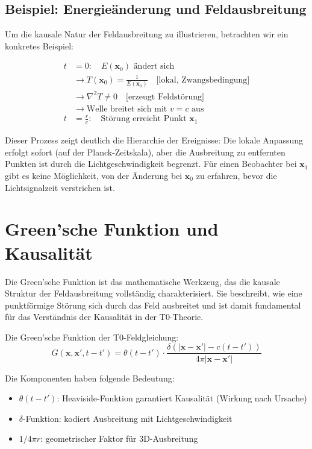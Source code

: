 	\subsection{Beispiel: Energieänderung und Feldausbreitung}
	
	Um die kausale Natur der Feldausbreitung zu illustrieren, betrachten wir ein konkretes Beispiel:
	
	\begin{align}
		t &= 0: \quad E(\mathbf{x}_0) \text{ ändert sich} \\
		&\rightarrow T(\mathbf{x}_0) = \frac{1}{E(\mathbf{x}_0)} \quad \text{[lokal, Zwangsbedingung]} \\
		&\rightarrow \nabla^2 T \neq 0 \quad \text{[erzeugt Feldstörung]} \\
		&\rightarrow \text{Welle breitet sich mit } v = c \text{ aus} \\
		t &= \frac{r}{c}: \quad \text{Störung erreicht Punkt } \mathbf{x}_1
	\end{align}
	
	Dieser Prozess zeigt deutlich die Hierarchie der Ereignisse: Die lokale Anpassung erfolgt sofort (auf der Planck-Zeitskala), aber die Ausbreitung zu entfernten Punkten ist durch die Lichtgeschwindigkeit begrenzt. Für einen Beobachter bei $\mathbf{x}_1$ gibt es keine Möglichkeit, von der Änderung bei $\mathbf{x}_0$ zu erfahren, bevor die Lichtsignalzeit verstrichen ist.
	
	\section{Green'sche Funktion und Kausalität}
	
	Die Green'sche Funktion ist das mathematische Werkzeug, das die kausale Struktur der Feldausbreitung vollständig charakterisiert. Sie beschreibt, wie eine punktförmige Störung sich durch das Feld ausbreitet und ist damit fundamental für das Verständnis der Kausalität in der T0-Theorie.
	
	Die Green'sche Funktion der T0-Feldgleichung:
	\begin{equation}
		G(\mathbf{x},\mathbf{x}',t-t') = \theta(t-t') \cdot \frac{\delta(|\mathbf{x}-\mathbf{x}'| - c(t-t'))}{4\pi|\mathbf{x}-\mathbf{x}'|} \label{eq:green}
	\end{equation}
	
	Die Komponenten haben folgende Bedeutung:
	\begin{itemize}
		\item $\theta(t-t')$: Heaviside-Funktion garantiert Kausalität (Wirkung nach Ursache)
		\item $\delta$-Funktion: kodiert Ausbreitung mit Lichtgeschwindigkeit
		\item $1/4\pi r$: geometrischer Faktor für 3D-Ausbreitung
	\end{itemize}
	
